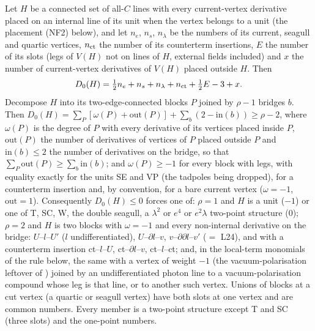 
\begin{lemma}\label{rot:h1s:CL}
Let $H$ be a connected set of all-$C$ lines with every current-vertex derivative placed on an internal line of its unit when the vertex belongs to a unit (the placement (NF2) below), and let $n_e$, $n_s$, $n_\lambda$ be the numbers of its current, seagull and quartic vertices, $n_{\rm ct}$ the number of its counterterm insertions, $E$ the number of its slots (legs of $V(H)$ not on lines of $H$, external fields included) and $x$ the number of current-vertex derivatives of $V(H)$ placed outside $H$. Then
\[
D_0(H)=\tfrac12n_e+n_s+n_\lambda+n_{\rm ct}+\tfrac12E-3+x .
\]
Decompose $H$ into its two-edge-connected blocks $P$ joined by $\rho-1$ bridges $b$. Then $D_0(H)=\sum_P[\omega(P)+\mathrm{out}(P)]+\sum_b(2-\mathrm{in}(b))\ge\rho-2$, where $\omega(P)$ is the degree of $P$ with every derivative of its vertices placed inside $P$, $\mathrm{out}(P)$ the number of derivatives of vertices of $P$ placed outside $P$ and $\mathrm{in}(b)\le2$ the number of derivatives on the bridge, so that $\sum_P\mathrm{out}(P)\ge\sum_b\mathrm{in}(b)$; and $\omega(P)\ge-1$ for every block with legs, with equality exactly for the units SE and VP (the tadpoles being dropped), for a counterterm insertion and, by convention, for a bare current vertex ($\omega=-1$, $\mathrm{out}=1$). Consequently $D_0(H)\le0$ forces one of: $\rho=1$ and $H$ is a unit ($-1$) or one of T, SC, W, the double seagull, a $\lambda^2$ or $e^4$ or $e^2\lambda$ two-point structure ($0$); $\rho=2$ and $H$ is two blocks with $\omega=-1$ and every non-internal derivative on the bridge: $U$--$l$--$U'$ ($l$ undifferentiated), $U$--$\partial l$--$v$, $v$--$\partial\partial l$--$v'$ ($=$ L24), and with a counterterm insertion ct--$l$--$U$, ct--$\partial l$--$v$, ct--$l$--ct; and, in the local-term monomials of the rule below, the same with a vertex of weight $-1$ (the vacuum-polarisation leftover of ) joined by an undifferentiated photon line to a vacuum-polarisation compound whose leg is that line, or to another such vertex. Unions of blocks at a cut vertex (a quartic or seagull vertex) have both slots at one vertex and are common numbers. Every member is a two-point structure except T and SC (three slots) and the one-point numbers.
\end{lemma}
